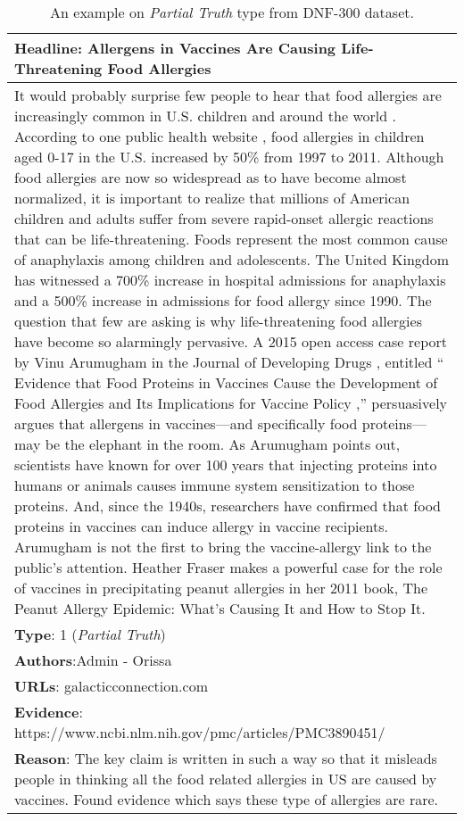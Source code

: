 \documentclass[11pt,a4paper]{article}
\begin{document}
\begin{table*}[t]
\centering
\begin{tabular}{p{15cm}}
\hline
\textbf{Headline}: Allergens in Vaccines Are Causing Life-Threatening Food Allergies\\
\hline 
It would probably surprise few people to hear that food allergies are increasingly common in U.S. children and around the world . According to one public health website , food allergies in children aged 0-17 in the U.S. increased by 50\% from 1997 to 2011. 
Although food allergies are now so widespread as to have become almost normalized, it is important to realize that millions of American children and adults suffer from severe rapid-onset allergic reactions that can be life-threatening. Foods represent the most common cause of anaphylaxis among children and adolescents. The United Kingdom has witnessed a 700\% increase in hospital admissions for anaphylaxis and a 500\% increase in admissions for food allergy since 1990. 
The question that few are asking is why life-threatening food allergies have become so alarmingly pervasive. A 2015 open access case report by Vinu Arumugham in the Journal of Developing Drugs , entitled `` Evidence that Food Proteins in Vaccines Cause the Development of Food Allergies and Its Implications for Vaccine Policy ,'' persuasively argues that allergens in vaccines—and specifically food proteins—may be the elephant in the room. 
As Arumugham points out, scientists have known for over 100 years that injecting proteins into humans or animals causes immune system sensitization to those proteins. And, since the 1940s, researchers have confirmed that food proteins in vaccines can induce allergy in vaccine recipients. Arumugham is not the first to bring the vaccine-allergy link to the public’s attention. Heather Fraser makes a powerful case for the role of vaccines in precipitating peanut allergies in her 2011 book, The Peanut Allergy Epidemic: What’s Causing It and How to Stop It.\\
\hline
\textbf{Type}: 1 (\textit{Partial Truth})\\
\textbf{Authors}:Admin - Orissa\\
\textbf{URLs}: galacticconnection.com\\
\hline
\textbf{Evidence}: https://www.ncbi.nlm.nih.gov/pmc/articles/PMC3890451/\\
\hline
\textbf{Reason}: The key claim is written in such a way so that it misleads people in thinking all the food related allergies in US are caused by vaccines. Found evidence which says these type of allergies are rare.\\
\hline
\end{tabular}
\caption{\label{tab:appendnf300_partial}An example on \textit{Partial Truth} type from DNF-300 dataset. 
}
\end{table*}
\end{document}
